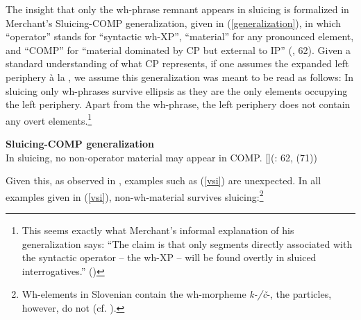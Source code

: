 \documentclass[output=paper,
modfonts,
newtxmath,
hidelinks
]{langscibook}
\begin{document}
The insight that only the wh-phrase remnant appears in sluicing is formalized in Merchant's Sluicing-COMP generalization, given in (\ref{generalization}), in which ``operator'' stands for ``syntactic wh-XP'', ``material'' for any pronounced element, and ``COMP'' for ``material dominated by CP but external to IP'' (\citealt{merchant2001}, 62). Given a standard understanding of what CP represents, if one assumes the expanded left periphery \`{a} la \cite{rizzi1997fine}, we assume this generalization was meant to be read as follows: In sluicing only wh-phrases survive ellipsis as they are the only elements occupying the left periphery. Apart from the wh-phrase, the left periphery does not contain any overt elements.\footnote{This seems exactly what Merchant's informal explanation of his generalization says: ``The claim is that only segments directly associated with the syntactic operator -- the wh-XP -- will be found overtly in sluiced interrogatives.'' (\citealt[62]{merchant2001})}

\begin{exe}
\ex\label{generalization} \textbf{Sluicing-COMP generalization}\\
In sluicing, no non-operator material may appear in COMP.\vspace{-3pt}
\exi{}[]{\hfill(\citealt{merchant2001}: 62, (71))}
\end{exe}

\noindent Given this, as observed in \cite{marusicetal2015}, examples such as (\ref{vsi}) are unexpected. In all examples given in (\ref{vsi}), non-wh-material survives sluicing:\footnote{Wh-elements in Slovenian contain the wh-morpheme \textit{k-/č}-, the particles, however, do not (cf. \citealt{marusicetal2015}).}
\end{document}
